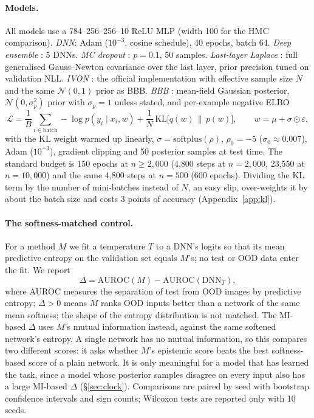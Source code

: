 \documentclass[10pt]{article}
\begin{document}
\paragraph{Models.} All models use a 784--256--256--10 ReLU MLP (width 100
for the HMC comparison). \emph{DNN}: Adam ($10^{-3}$, cosine schedule), 40
epochs, batch 64. \emph{Deep ensemble} \citep{lakshminarayanan2017simple}: 5
DNNs. \emph{MC dropout} \citep{gal2016dropout}: $p=0.1$, 50 samples.
\emph{Last-layer Laplace} \citep{daxberger2021laplace}: full generalised
Gauss--Newton covariance over the last layer, prior precision tuned on
validation NLL. \emph{IVON} \citep{shen2024variational}: the official
implementation with effective sample size $N$ and the same $\mathcal N(0,1)$
prior as BBB. \emph{BBB} \citep{blundell2015weight}: mean-field Gaussian
posterior, $\mathcal N(0,\sigma_p^2)$ prior with $\sigma_p=1$ unless stated,
and per-example negative ELBO
\begin{equation}
\mathcal{L} = \frac{1}{B}\sum_{i\in\text{batch}} -\log p(y_i\mid x_i, w)
+ \frac{1}{N}\,\mathrm{KL}\big[q(w)\,\|\,p(w)\big], \qquad w=\mu+\sigma\odot\varepsilon,
\label{eq:elbo}
\end{equation}
with the KL weight warmed up linearly, $\sigma=\mathrm{softplus}(\rho)$,
$\rho_0=-5$ ($\sigma_0\approx0.007$), Adam ($10^{-3}$), gradient clipping and
50 posterior samples at test time. The standard budget is 150 epochs at
$n\ge2{,}000$ (4{,}800 steps at $n=2{,}000$, 23{,}550 at $n=10{,}000$) and the same
4{,}800 steps at $n=500$ (600 epochs). Dividing the KL
term by the number of mini-batches instead of $N$, an easy slip, over-weights
it by about the batch size and costs 3 points of accuracy
(Appendix~\ref{app:kl}).

\paragraph{The softness-matched control.} For a method $M$ we fit a
temperature $T$ to a DNN's logits so that its mean predictive entropy on the
validation set equals $M$'s; no test or OOD data enter the fit. We report
\begin{equation}
\Delta=\mathrm{AUROC}(M)-\mathrm{AUROC}(\mathrm{DNN}_T),
\end{equation}
where AUROC measures the separation of test from OOD images by predictive
entropy; $\Delta>0$ means $M$ ranks OOD inputs better than a network of the
same mean softness; the shape of the entropy distribution is not matched. The
MI-based $\Delta$ uses $M$'s mutual information
\citep{depeweg2018decomposition} instead, against the same softened network's
entropy. A single network has no mutual information, so this compares two
different scores: it asks whether $M$'s epistemic score beats the best
softness-based score of a plain network. It is only meaningful for a model
that has learned the task, since a model whose posterior samples disagree on
every input also has a large MI-based $\Delta$ (\S\ref{sec:clock}). Comparisons are
paired by seed with bootstrap confidence intervals and sign counts; Wilcoxon
tests are reported only with 10 seeds.
\end{document}
